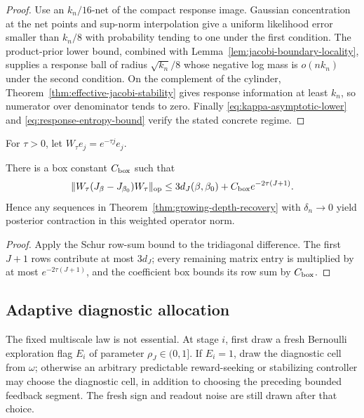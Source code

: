 \begin{proof}
Use an \(k_n/16\)-net of the compact response image.  Gaussian concentration
at the net points and sup-norm interpolation give a uniform likelihood error
smaller than \(k_n/8\) with probability tending to one under the first
condition.  The product-prior lower bound, combined with
Lemma~\ref{lem:jacobi-boundary-locality}, supplies a response ball of radius
\(\sqrt{k_n}/8\) whose negative log mass is \(o(nk_n)\) under the second
condition.  On the
complement of the cylinder, Theorem~\ref{thm:effective-jacobi-stability}
gives response information at least \(k_n\), so numerator over denominator
tends to zero.  Finally \eqref{eq:kappa-asymptotic-lower} and
\eqref{eq:response-entropy-bound} verify the stated concrete regime.
\end{proof}

For \(\tau>0\), let \(W_\tau e_j=e^{-\tau j}e_j\).

\begin{corollary}
\label{cor:weighted-operator-recovery}
There is a box constant \(C_{\rm box}\) such that
\begin{equation}
 \|W_\tau(J_\beta-J_{\beta_0})W_\tau\|_{\rm op}
 \le3d_J(\beta,\beta_0)+C_{\rm box}e^{-2\tau(J+1)}.
 \label{eq:weighted-operator-bound}
\end{equation}
Hence any sequences in Theorem~\ref{thm:growing-depth-recovery} with
\(\delta_n\to0\) yield posterior contraction in this weighted operator norm.
\end{corollary}

\begin{proof}
Apply the Schur row-sum bound to the tridiagonal difference.  The first
\(J+1\) rows contribute at most \(3d_J\); every remaining matrix entry is
multiplied by at most \(e^{-2\tau(J+1)}\), and the coefficient box bounds its
row sum by \(C_{\rm box}\).
\end{proof}

\subsection{Adaptive diagnostic allocation}

The fixed multiscale law is not essential.  At stage \(i\), first draw a fresh
Bernoulli exploration flag \(E_i\) of parameter \(\rho_J\in(0,1]\).  If
\(E_i=1\), draw the diagnostic cell from \(\omega\); otherwise an arbitrary
predictable reward-seeking or stabilizing controller may choose the diagnostic
cell, in addition to choosing the preceding bounded feedback segment.  The
fresh sign and readout noise are still drawn after that choice.

